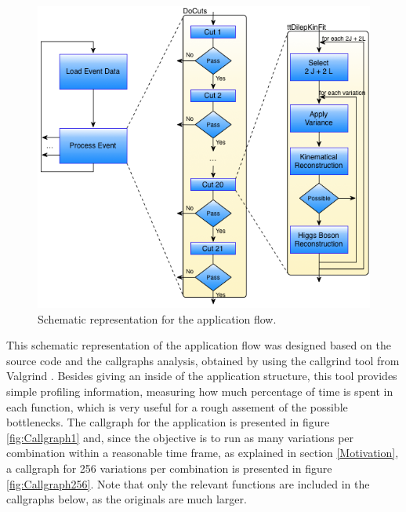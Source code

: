 \begin{figure}[!htp]
	\begin{center}
		\includegraphics[scale=0.5]{../../common/img/graf_abstract_flow_with_kinfit.png}
		\caption{Schematic representation for the \tth application flow.}
		\label{fig:SchematicFlow1}
	\end{center}
\end{figure}

This schematic representation of the application flow was designed based on the source code and the callgraphs analysis, obtained by using the callgrind tool from Valgrind \cite{Valgrind}. Besides giving an inside of the application structure, this tool provides simple profiling information, measuring how much percentage of time is spent in each function, which is very useful for a rough assement of the possible bottlenecks. The callgraph for the application is presented in figure \ref{fig:Callgraph1} and, since the objective is to run as many variations per combination within a reasonable time frame, as explained in section \ref{Motivation}, a callgraph for 256 variations per combination is presented in figure \ref{fig:Callgraph256}. Note that only the relevant functions are included in the callgraphs below, as the originals are much larger.

